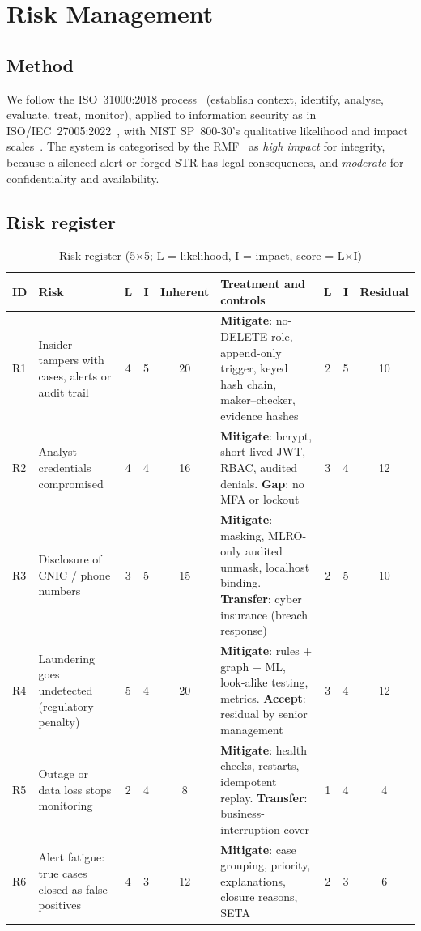 \documentclass[conference,10pt]{IEEEtran}
\newcommand{\tbl}{\scriptsize\renewcommand{\arraystretch}{1.12}}
\begin{document}
\section{Risk Management}\label{sec:risk}

\subsection{Method}\label{sec:method}
We follow the ISO~31000:2018 process~\cite{iso31000} (establish context, identify, analyse,
evaluate, treat, monitor), applied to information security as in ISO/IEC~27005:2022~\cite{iso27005},
with NIST SP~800-30's qualitative likelihood and impact scales~\cite{nist80030}. The system is
categorised by the RMF~\cite{nist80037} as \emph{high impact} for integrity, because a silenced alert
or forged STR has legal consequences, and \emph{moderate} for confidentiality and availability.

\subsection{Risk register}

\begin{table}[t]
\caption{Risk register (5$\times$5; L = likelihood, I = impact, score = L$\times$I)}\label{tab:risk}
\centering\tbl
\begin{tabularx}{\textwidth}{@{}lp{3.4cm}cccLccc@{}}
\toprule
ID & Risk & L & I & Inherent & Treatment and controls & L & I & Residual \\ \midrule
R1 & Insider tampers with cases, alerts or audit trail & 4 & 5 & 20 & \textbf{Mitigate}: no-DELETE role, append-only trigger, keyed hash chain, maker--checker, evidence hashes & 2 & 5 & 10 \\
R2 & Analyst credentials compromised & 4 & 4 & 16 & \textbf{Mitigate}: bcrypt, short-lived JWT, RBAC, audited denials. \textbf{Gap}: no MFA or lockout & 3 & 4 & 12 \\
R3 & Disclosure of CNIC / phone numbers & 3 & 5 & 15 & \textbf{Mitigate}: masking, MLRO-only audited unmask, localhost binding. \textbf{Transfer}: cyber insurance (breach response) & 2 & 5 & 10 \\
R4 & Laundering goes undetected (regulatory penalty) & 5 & 4 & 20 & \textbf{Mitigate}: rules + graph + ML, look-alike testing, metrics. \textbf{Accept}: residual by senior management & 3 & 4 & 12 \\
R5 & Outage or data loss stops monitoring & 2 & 4 & 8 & \textbf{Mitigate}: health checks, restarts, idempotent replay. \textbf{Transfer}: business-interruption cover & 1 & 4 & 4 \\
R6 & Alert fatigue: true cases closed as false positives & 4 & 3 & 12 & \textbf{Mitigate}: case grouping, priority, explanations, closure reasons, SETA & 2 & 3 & 6 \\
\bottomrule
\end{tabularx}
\end{table}
\end{document}
